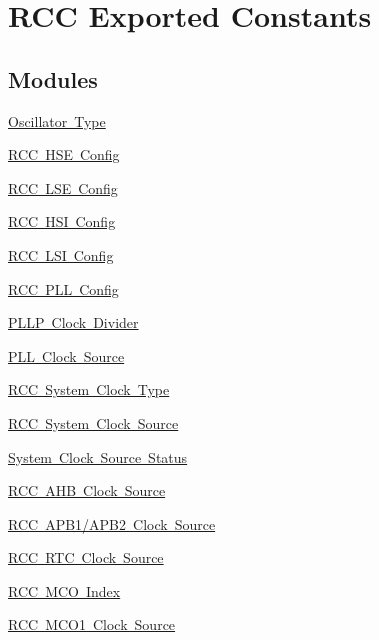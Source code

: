 \hypertarget{group___r_c_c___exported___constants}{}\section{R\+CC Exported Constants}
\label{group___r_c_c___exported___constants}
\subsection*{Modules}
\begin{DoxyCompactItemize}
\item 
\mbox{\hyperlink{group___r_c_c___oscillator___type}{Oscillator Type}}
\item 
\mbox{\hyperlink{group___r_c_c___h_s_e___config}{R\+C\+C H\+S\+E Config}}
\item 
\mbox{\hyperlink{group___r_c_c___l_s_e___config}{R\+C\+C L\+S\+E Config}}
\item 
\mbox{\hyperlink{group___r_c_c___h_s_i___config}{R\+C\+C H\+S\+I Config}}
\item 
\mbox{\hyperlink{group___r_c_c___l_s_i___config}{R\+C\+C L\+S\+I Config}}
\item 
\mbox{\hyperlink{group___r_c_c___p_l_l___config}{R\+C\+C P\+L\+L Config}}
\item 
\mbox{\hyperlink{group___r_c_c___p_l_l_p___clock___divider}{P\+L\+L\+P Clock Divider}}
\item 
\mbox{\hyperlink{group___r_c_c___p_l_l___clock___source}{P\+L\+L Clock Source}}
\item 
\mbox{\hyperlink{group___r_c_c___system___clock___type}{R\+C\+C System Clock Type}}
\item 
\mbox{\hyperlink{group___r_c_c___system___clock___source}{R\+C\+C System Clock Source}}
\item 
\mbox{\hyperlink{group___r_c_c___system___clock___source___status}{System Clock Source Status}}
\item 
\mbox{\hyperlink{group___r_c_c___a_h_b___clock___source}{R\+C\+C A\+H\+B Clock Source}}
\item 
\mbox{\hyperlink{group___r_c_c___a_p_b1___a_p_b2___clock___source}{R\+C\+C A\+P\+B1/\+A\+P\+B2 Clock Source}}
\item 
\mbox{\hyperlink{group___r_c_c___r_t_c___clock___source}{R\+C\+C R\+T\+C Clock Source}}
\item 
\mbox{\hyperlink{group___r_c_c___m_c_o___index}{R\+C\+C M\+C\+O Index}}
\item 
\mbox{\hyperlink{group___r_c_c___m_c_o1___clock___source}{R\+C\+C M\+C\+O1 Clock Source}}

\end{DoxyCompactItemize}

